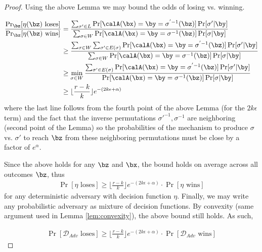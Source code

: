 \begin{proof}
Using the above Lemma we may bound the odds of losing vs. winning. 

\begin{align*}
    \frac{\Pr_\bz[\eta(\bz) \text{ loses}]}{\Pr_\bz[\eta(\bz) \text{ wins}]}
    &= \frac{ \sum_{\sigma' \in L} \Pr [\calA(\bx) = \by = \sigma^{'-1}(\bz)]  \Pr [ \sigma' | \by ] }
    { \sum_{\sigma \in W} \Pr [\calA(\bx) = \by = \sigma^{-1}(\bz)]  \Pr [ \sigma | \by ] } \\
    &\geq \frac{\sum_{\sigma \in W} \sum_{\sigma' \in E(\sigma)} \Pr [\calA(\bx) = \by = \sigma^{'-1}(\bz)]  \Pr [ \sigma' | \by ]}
    {\sum_{\sigma \in W} \Pr [\calA(\bx) = \by = \sigma^{-1}(\bz)]  \Pr [ \sigma | \by ]} \\
    &\geq \min_{\sigma \in W} \frac{\sum_{\sigma' \in E(\sigma)} \Pr [\calA(\bx) = \by = \sigma^{'-1}(\bz)]  \Pr [ \sigma' | \by ]}{\Pr [\calA(\bx) = \by = \sigma^{-1}(\bz)]  \Pr [ \sigma | \by ]} \\
    &\geq \lfloor \frac{r-k}{k} \rfloor e^{-(2k\epsilon + \alpha)}
\end{align*}
where the last line follows from the fourth point of the above Lemma (for the $2k\epsilon$ term) and the fact that the inverse permutations $\sigma'^{-1}, \sigma^{-1}$ are neighboring (second point of the Lemma) so the probabilities of the mechanism to produce $\sigma$ vs. $\sigma'$ to reach $\bz$ from these neighboring permutations must be close by a factor of $e^{\alpha}$. 

Since the above holds for any $\bz$ and $\bx$, the bound holds on average across all outcomes $\bz$, thus 
\begin{align*}
    \Pr[\eta \text{ loses}] \geq \lfloor \frac{r-k}{k} \rfloor e^{-(2k\epsilon+\alpha)} \cdot \Pr[\eta \text{ wins}]
\end{align*}
for any deterministic adversary with decision function $\eta$. Finally, we may write any probabilistic adversary as mixture of decision functions. By convexity (same argument used in Lemma \ref{lem:convexity}), the above bound still holds. As such, 

\begin{align*}
    \Pr[\mathcal{D}_{Adv} \text{ loses}] \geq \lfloor \frac{r-k}{k} \rfloor e^{-(2k\epsilon+\alpha)} \cdot \Pr[\mathcal{D}_{Adv} \text{ wins}]
\end{align*}

 \end{proof}
 

